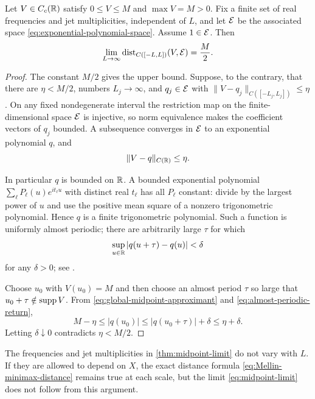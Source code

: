 \begin{theorem}
\label{thm:midpoint-limit}
Let $V\in C_c(\mathbb R)$ satisfy $0\leq V\leq M$ and $\max V=M>0$.  Fix a finite
set of real frequencies and jet multiplicities, independent of $L$, and
let $\mathcal E$ be the associated space \eqref{eq:exponential-polynomial-space}.
Assume $1\in\mathcal E$.  Then
\begin{equation}\label{eq:midpoint-limit}
 \lim_{L\to\infty}\operatorname{dist}_{C([-L,L])}(V,\mathcal E)=\frac{M}{2}.
\end{equation}
\end{theorem}

\begin{proof}
The constant $M/2$ gives the upper bound.  Suppose, to the contrary, that
there are $\eta<M/2$, numbers $L_j\to\infty$, and $q_j\in\mathcal E$ with
\(
 \|V-q_j\|_{C([-L_j,L_j])}\leq\eta
\).
On any fixed nondegenerate interval the restriction map on the
finite-dimensional space $\mathcal E$ is injective, so norm equivalence makes the
coefficient vectors of $q_j$ bounded.  A subsequence converges in $\mathcal E$ to
an exponential polynomial $q$, and
\begin{equation}\label{eq:global-midpoint-approximant}
 \|V-q\|_{C(\mathbb R)}\leq\eta.
\end{equation}

In particular $q$ is bounded on $\mathbb R$.  A bounded exponential polynomial
$\sum_\ell P_\ell(u)e^{it_\ell u}$ with distinct real $t_\ell$ has all
$P_\ell$ constant: divide by the largest power of $u$ and use the positive
mean square of a nonzero trigonometric polynomial.  Hence $q$ is a finite
trigonometric polynomial.  Such a function is uniformly almost periodic;
there are arbitrarily large $\tau$ for which
\begin{equation}\label{eq:almost-periodic-return}
 \sup_{u\in\mathbb R}|q(u+\tau)-q(u)|<\delta
\end{equation}
for any $\delta>0$; see \citep{Corduneanu1989}.

Choose $u_0$ with $V(u_0)=M$ and then choose an almost period $\tau$ so
large that $u_0+\tau\notin\operatorname{supp} V$.  From
\eqref{eq:global-midpoint-approximant} and
\eqref{eq:almost-periodic-return},
\[
 M-\eta\leq|q(u_0)|
 \leq|q(u_0+\tau)|+\delta\leq\eta+\delta.
\]
Letting $\delta\downarrow0$ contradicts $\eta<M/2$.
\end{proof}

\begin{remark}
The frequencies and jet multiplicities in
\cref{thm:midpoint-limit} do not vary with $L$.  If they are allowed to
depend on $X$, the exact distance formula
\eqref{eq:Mellin-minimax-distance} remains true at each scale, but the
limit \eqref{eq:midpoint-limit} does not follow from this argument.
\end{remark}

